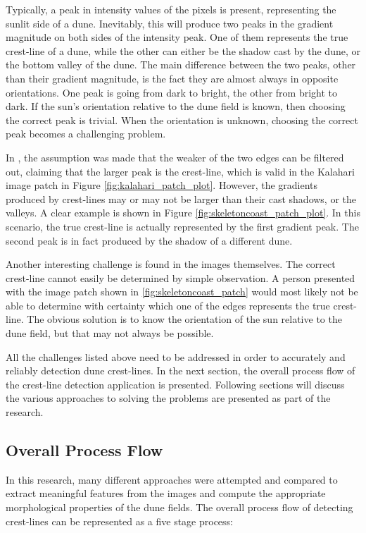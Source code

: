 Typically, a peak in intensity values of the pixels is present, representing the sunlit side of a dune. Inevitably, this will produce two peaks in the gradient magnitude on both sides of the intensity peak. One of them represents the true crest-line of a dune, while the other can either be the shadow cast by the dune, or the bottom valley of the dune. The main difference between the two peaks, other than their gradient magnitude, is the fact they are almost always in opposite orientations. One peak is going from dark to bright, the other from bright to dark. If the sun's orientation relative to the dune field is known, then choosing the correct peak is trivial. When the orientation is unknown, choosing the correct peak becomes a challenging problem. 

In \cite{2015_automated_mapping_of_linear_dunefield}, the assumption was made that the weaker of the two edges can be filtered out, claiming that the larger peak is the crest-line, which is valid in the Kalahari image patch in Figure \ref{fig:kalahari_patch_plot}. However, the gradients produced by crest-lines may or may not be larger than their cast shadows, or the valleys. A clear example is shown in Figure \ref{fig:skeletoncoast_patch_plot}. In this scenario, the true crest-line is actually represented by the first gradient peak. The second peak is in fact produced by the shadow of a different dune.

Another interesting challenge is found in the images themselves. The correct crest-line cannot easily be determined by simple observation. A person presented with the image patch shown in \ref{fig:skeletoncoast_patch} would most likely not be able to determine with certainty which one of the edges represents the true crest-line. The obvious solution is to know the orientation of the sun relative to the dune field, but that may not always be possible.

All the challenges listed above need to be addressed in order to accurately and reliably detection dune crest-lines. In the next section, the overall process flow of the crest-line detection application is presented. Following sections will discuss the various approaches to solving the problems are presented as part of the research.

\subsection{Overall Process Flow}

In this research, many different approaches were attempted and compared to extract meaningful features from the images and compute the appropriate morphological properties of the dune fields. The overall process flow of detecting crest-lines can be represented as a five stage process:

